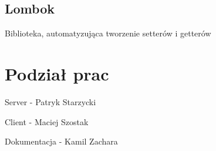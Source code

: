 \documentclass{article}
\begin{document}
\subsection{Lombok}
Biblioteka, automatyzująca tworzenie setterów i getterów







\section{Podział prac}
\begin{center}
Server - Patryk Starzycki

Client - Maciej Szostak

Dokumentacja - Kamil Zachara
\end{center}
\end{document}
